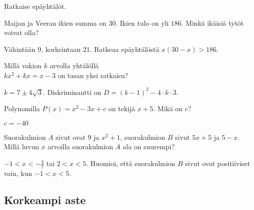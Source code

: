 \begin{tehtavasivu}
\begin{tehtava} 
Ratkaise epäyhtälöt.
		\begin{alakohdat}
		\end{alakohdat}
    \begin{vastaus}
		\begin{alakohdat}
		\alakohta{$ -2 < x < 3 $}
		\alakohta{$x \leq 0$ tai $x \geq 5$}
	\end{alakohdat}
    \end{vastaus}
\end{tehtava}

\begin{tehtava} 
Maijan ja Veeran ikien summa on $30$. Ikien tulo on yli $186$. Minkä ikäisiä tytöt voivat olla?
    \begin{vastaus}
	Vähintään $9$, korkeintaan $21$. Ratkeaa epäyhtälöstä $x(30-x)>186$.
	\end{vastaus}
\end{tehtava}

\begin{tehtava} 
Millä vakion $k$ arvolla yhtälöllä \\ $kx^2+kx=x-3$ on tasan yksi ratkaisu?
    \begin{vastaus}
		$k = 7 \pm 4 \sqrt{3}$. Diskriminantti on $D = (k-1)^2-4\cdot k \cdot 3$.
    \end{vastaus}
\end{tehtava}

\begin{tehtava} 
Polynomilla $P(x)=x^2-3x+c$ on tekijä $x+5$. Mikä on $c$?
    \begin{vastaus}
		$c=-40$
    \end{vastaus}
\end{tehtava}

\begin{tehtava} 
Suorakulmion $A$ sivut ovat $9$ ja $x^2+1$, suorakulmion $B$ sivut $5x+5$
ja $5-x$. Millä luvun $x$ arvoilla suorakulmion $A$ ala on suurempi?
    \begin{vastaus}
	$-1 < x < -\frac{4}{7}$ tai $2 < x < 5$. Huomioi, että suorakulmion $B$
    sivut ovat positiiviset vain, kun $-1<x<5$.
    \end{vastaus}
\end{tehtava}

\subsection*{Korkeampi aste}


\end{tehtavasivu}
